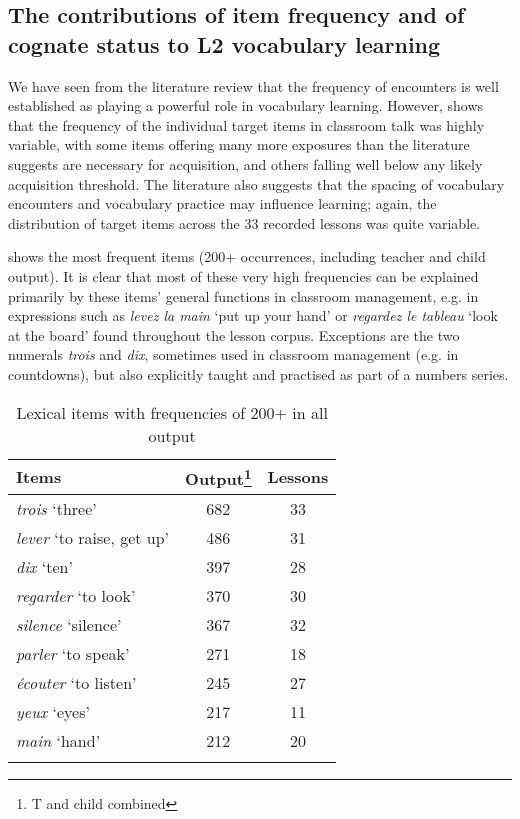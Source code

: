 \documentclass[output=paper]{langscibook}
\begin{document}
\subsection{The contributions of item frequency and of cognate status to L2 vocabulary learning}

We have seen from the literature review that the frequency of encounters is well established as playing a powerful role in vocabulary learning. However,  shows that the frequency of the individual target items in classroom talk was highly variable, with some items offering many more exposures than the literature suggests are necessary for acquisition, and others falling well below any likely acquisition threshold. The literature also suggests that the spacing of vocabulary encounters and vocabulary practice may influence learning; again, the distribution of target items across the 33 recorded lessons was quite variable.

 shows the most frequent items (200+ occurrences, including teacher and child output). It is clear that most of these very high frequencies can be explained primarily by these items’ general functions in classroom management, e.g. in expressions such as \textit{levez la main} `put up your hand' or \textit{regardez le tableau} `look at the board' found throughout the lesson corpus. Exceptions are the two numerals \textit{trois} and \textit{dix}, sometimes used in classroom management (e.g. in countdowns), but also explicitly taught and practised as part of a numbers series.

\begin{table}
\begin{tabular}{lcc}
\lsptoprule
{Items} &	Output\footnote{T and child combined}	& Lessons\\\midrule
\textit{trois} `three' &	682 &	33\\
\textit{lever} `to raise, get up' &	486 &	31\\
\textit{dix} `ten' &	397 &	28\\
\textit{regarder} `to look' &	370 &	30\\
\textit{silence} `silence' &	367 &	32\\
\textit{parler} `to speak' &	271	& 18\\
\textit{écouter} `to listen'	& 245 &	27\\
\textit{yeux} `eyes'	& 217	& 11\\
\textit{main} `hand'	& 212 &	20\\
\lspbottomrule
\end{tabular}
\caption{\label{tab:mitchell:2}Lexical items with frequencies of 200+ in all output}
\end{table}
\end{document}
